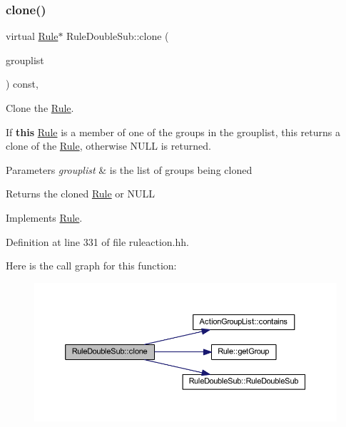 \subsubsection{\texorpdfstring{clone()}{clone()}}
{\footnotesize\ttfamily virtual \mbox{\hyperlink{class_rule}{Rule}}$\ast$ Rule\+Double\+Sub\+::clone (\begin{DoxyParamCaption}\item[{const \mbox{\hyperlink{class_action_group_list}{Action\+Group\+List}} \&}]{grouplist }\end{DoxyParamCaption}) const\hspace{0.3cm}{\ttfamily [inline]}, {\ttfamily [virtual]}}



Clone the \mbox{\hyperlink{class_rule}{Rule}}. 

If {\bfseries{this}} \mbox{\hyperlink{class_rule}{Rule}} is a member of one of the groups in the grouplist, this returns a clone of the \mbox{\hyperlink{class_rule}{Rule}}, otherwise N\+U\+LL is returned. 
\begin{DoxyParams}{Parameters}
{\em grouplist} & is the list of groups being cloned \\
\hline
\end{DoxyParams}
\begin{DoxyReturn}{Returns}
the cloned \mbox{\hyperlink{class_rule}{Rule}} or N\+U\+LL 
\end{DoxyReturn}


Implements \mbox{\hyperlink{class_rule_a70de90a76461bfa7ea0b575ce3c11e4d}{Rule}}.



Definition at line 331 of file ruleaction.\+hh.

Here is the call graph for this function\+:
\nopagebreak
\begin{figure}[H]
\begin{center}
\leavevmode
\includegraphics[width=350pt]{class_rule_double_sub_a147bf9b04ba739cbf37cfad58970b23c_cgraph}
\end{center}
\end{figure}
\mbox{\label{class_rule_double_sub_a7db3af66a209f1ea878ff270099f4086}} 
